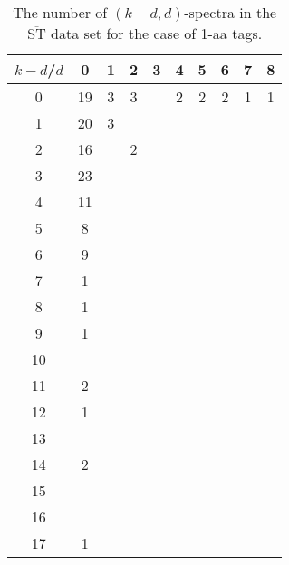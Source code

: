 \documentclass{article}
\def\STbar{{\overline{\mathrm{ST}}}}
\begin{document}
\begin{table}[h]\footnotesize
{\centering
\begin{tabular}{|c|c|
c|c|c|c|c|c|c|c|}
  \hline
  $k-d$/$d$ 
 & 0 & 1 & 2 & 3 & 4 & 5 & 6 & 7 & 8\\

  \hline
  \hline

0  & 19 & 3 & 3 &  & 2 & 2 & 2 & 1 & 1\\

1  & 20 & 3 &  &  &  &  &  &  & \\

2  & 16 &  & 2 &  &  &  &  &  & \\

3  & 23 &  &  &  &  &  &  &  & \\

4  & 11 &  &  &  &  &  &  &  & \\

5  & 8 &  &  &  &  &  &  &  & \\

6  & 9 &  &  &  &  &  &  &  & \\

7  & 1 &  &  &  &  &  &  &  & \\

8  & 1 &  &  &  &  &  &  &  & \\

9  & 1 &  &  &  &  &  &  &  & \\

10  &  &  &  &  &  &  &  &  & \\

11  & 2 &  &  &  &  &  &  &  & \\

12  & 1 &  &  &  &  &  &  &  & \\

13  &  &  &  &  &  &  &  &  & \\

14  & 2 &  &  &  &  &  &  &  & \\

15  &  &  &  &  &  &  &  &  & \\

16  &  &  &  &  &  &  &  &  & \\

17  & 1 &  &  &  &  &  &  &  & \\

  \hline
\end{tabular}
\par}
\centering
\caption{The number of $(k-d,d)$-spectra in the $\STbar$ data set for the case of 1-aa tags.}
\vspace{3mm}
\label{table:kd-1-ST}
\end{table}
\end{document}

